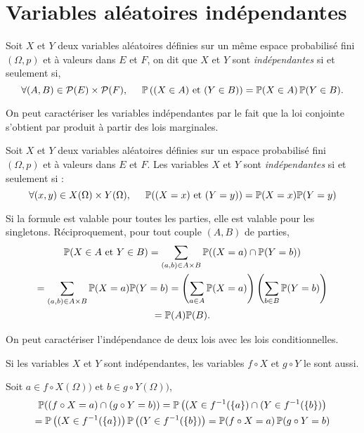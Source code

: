 \section{Variables aléatoires indépendantes}
\begin{defi}
 Soit $X$ et $Y$ deux variables aléatoires définies sur un même espace probabilisé fini $(\Omega,p)$ et à valeurs dans $E$ et $F$, on dit que $X$ et $Y$ sont \emph{indépendantes} si et seulement si,
\begin{displaymath}
\forall (A,B) \in \mathcal{P}(E)\times \mathcal{P}(F), \hspace{0.5cm} \mathbb{P}\left((X\in A)\text{ et } (Y\in B)\right) = \mathbb{P}(X\in A)\, \mathbb{P}(Y\in B).
\end{displaymath}
\end{defi}
On peut caractériser les variables indépendantes par le fait que la loi conjointe s'obtient par produit à partir des lois marginales.
\begin{prop}
Soit $X$ et $Y$ deux variables aléatoires définies sur un espace probabilisé fini $(\Omega,p)$ et à valeurs dans $E$ et $F$. Les variables $X$ et $Y$ sont \emph{indépendantes} si et seulement si :
\begin{displaymath}
 \forall(x,y)\in X(\Omega)\times Y(\Omega),\hspace{0.5cm}
\mathbb{P}((X=x)\text{ et } (Y=y)) = \mathbb{P}(X=x) \mathbb{P}(Y=y)
\end{displaymath}
\end{prop}
\begin{demo}
Si la formule est valable pour toutes les parties, elle est valable pour les singletons. Réciproquement, pour tout couple $(A,B)$ de parties,
\begin{multline*}
 \mathbb{P}(X\in A\text{ et }Y\in B)= \sum_{(a,b)\in A\times B}\mathbb{P}( (X=a)\cap\mathbb{P}(Y=b))\\
= \sum_{(a,b)\in A\times B}\mathbb{P}(X=a) \mathbb{P}(Y=b)
= \left( \sum_{a\in A}\mathbb{P}(X=a)\right) \left( \sum_{b\in B}\mathbb{P}(Y=b)\right) \\= \mathbb{P}(A) \mathbb{P}(B).
\end{multline*}
\end{demo}
\begin{rem}
 On peut caractériser l'indépendance de deux lois avec les lois conditionnelles.
\end{rem}
\newpage
\begin{prop}
Si les variables $X$ et $Y$ sont indépendantes, les variables $f\circ X$ et $g\circ Y$ le sont aussi. 
\end{prop}
\begin{demo}
 Soit $a\in f\circ X(\Omega))$ et $b\in g\circ Y(\Omega))$,
\begin{multline*}
 \mathbb{P}((f\circ X=a)\cap (g\circ Y=b)) = \mathbb{P}\left( (X\in f^{-1}(\{a\})\cap (Y\in f^{-1}(\{b\})\right)\\
 = \mathbb{P}\left( (X\in f^{-1}(\{a\})\right) \mathbb{P}\left(  (Y\in f^{-1}(\{b\})\right)
=\mathbb{P}(f\circ X =a) \,\mathbb{P}(g\circ Y =b)
\end{multline*}
\end{demo}
